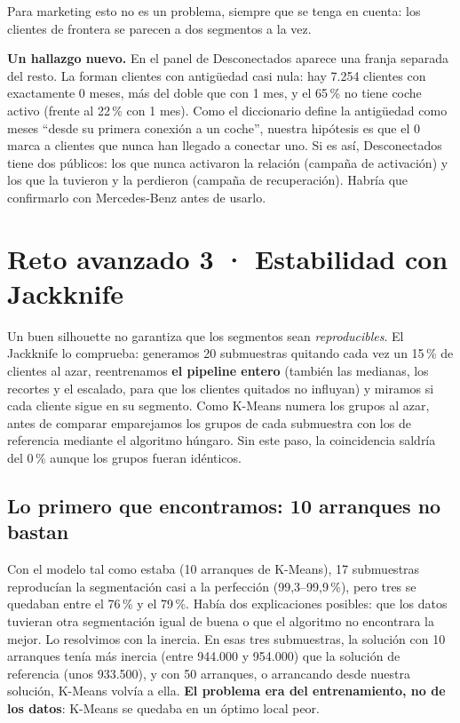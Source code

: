 \documentclass[11pt,a4paper]{article}
\begin{document}
Para marketing esto no es un problema, siempre que se tenga en cuenta: los clientes de frontera se parecen a dos segmentos a la vez.

\textbf{Un hallazgo nuevo.} En el panel de Desconectados aparece una franja separada del resto. La forman clientes con antigüedad casi nula: hay 7.254 clientes con exactamente 0 meses, más del doble que con 1 mes, y el 65\,\% no tiene coche activo (frente al 22\,\% con 1 mes). Como el diccionario define la antigüedad como meses ``desde su primera conexión a un coche'', nuestra hipótesis es que el 0 marca a clientes que nunca han llegado a conectar uno. Si es así, Desconectados tiene dos públicos: los que nunca activaron la relación (campaña de activación) y los que la tuvieron y la perdieron (campaña de recuperación). Habría que confirmarlo con Mercedes-Benz antes de usarlo.

\section{Reto avanzado 3 · Estabilidad con Jackknife}

Un buen silhouette no garantiza que los segmentos sean \emph{reproducibles}. El Jackknife lo comprueba: generamos 20 submuestras quitando cada vez un 15\,\% de clientes al azar, reentrenamos \textbf{el pipeline entero} (también las medianas, los recortes y el escalado, para que los clientes quitados no influyan) y miramos si cada cliente sigue en su segmento. Como K-Means numera los grupos al azar, antes de comparar emparejamos los grupos de cada submuestra con los de referencia mediante el algoritmo húngaro. Sin este paso, la coincidencia saldría del 0\,\% aunque los grupos fueran idénticos.

\subsection*{Lo primero que encontramos: 10 arranques no bastan}

Con el modelo tal como estaba (10 arranques de K-Means), 17 submuestras reproducían la segmentación casi a la perfección (99,3--99,9\,\%), pero tres se quedaban entre el 76\,\% y el 79\,\%. Había dos explicaciones posibles: que los datos tuvieran otra segmentación igual de buena o que el algoritmo no encontrara la mejor. Lo resolvimos con la inercia. En esas tres submuestras, la solución con 10 arranques tenía más inercia (entre 944.000 y 954.000) que la solución de referencia (unos 933.500), y con 50 arranques, o arrancando desde nuestra solución, K-Means volvía a ella. \textbf{El problema era del entrenamiento, no de los datos}: K-Means se quedaba en un óptimo local peor.
\end{document}
